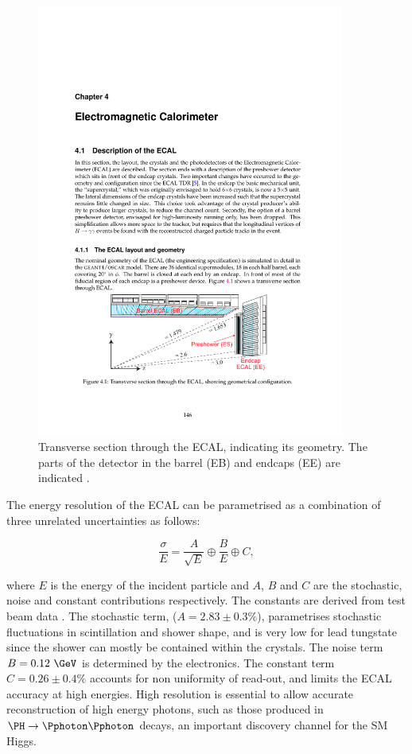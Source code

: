 \begin{figure}[htbp]
   \includegraphics[width=0.9\textwidth]{plots/detector/ecal_layout.pdf}
\caption[Transverse section through the \ac{ECAL}, indicating its geometry.]
{Transverse section through the \ac{ECAL}, indicating its geometry. The
parts of the detector in the barrel (EB) and endcaps (EE) are indicated
\cite{TDR}.}
\label{fig:ecal}
\end{figure}

The energy resolution of the \ac{ECAL} can be parametrised as a combination of
three unrelated uncertainties as follows:

\begin{equation}
\frac{\sigma}{E} = \frac{A}{\sqrt{E}} \oplus \frac{B}{E} \oplus C , 
\end{equation}

where $E$ is the energy of the incident particle and $A$, $B$ and $C$ are the
stochastic, noise and constant contributions respectively. The constants are
derived from test beam data \cite{Chatrchyan:2008aa}. The stochastic term, ($A=2.83\pm0.3\%$),
parametrises stochastic fluctuations in scintillation and shower shape, and is
very low for lead tungstate since the shower can mostly be contained within the
crystals. The noise term $B=0.12~\GeV$ is determined by the electronics. The
constant term $C=0.26\pm0.4\%$ accounts for non uniformity of read-out, 
and limits the \ac{ECAL} accuracy at high energies.
High resolution is essential to allow accurate reconstruction of high energy
photons, such as those produced in $\PH\to\Pphoton\Pphoton$ decays, an important
discovery channel for the \ac{SM} Higgs.

